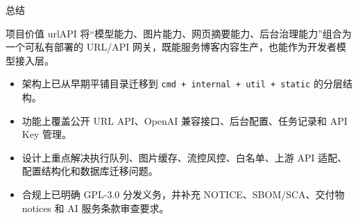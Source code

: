 \documentclass[aspectratio=169,UTF8]{ctexbeamer}
\newcommand{\code}[1]{\texttt{#1}}
\begin{document}
\begin{frame}{总结}
  \begin{block}{项目价值}
    urlAPI 将“模型能力、图片能力、网页摘要能力、后台治理能力”组合为一个可私有部署的 URL/API 网关，既能服务博客内容生产，也能作为开发者模型接入层。
  \end{block}

  \begin{itemize}
    \item 架构上已从早期平铺目录迁移到 \code{cmd + internal + util + static} 的分层结构。
    \item 功能上覆盖公开 URL API、OpenAI 兼容接口、后台配置、任务记录和 API Key 管理。
    \item 设计上重点解决执行队列、图片缓存、流控风控、白名单、上游 API 适配、配置结构化和数据库迁移问题。
    \item 合规上已明确 GPL-3.0 分发义务，并补充 NOTICE、SBOM/SCA、交付物 notices 和 AI 服务条款审查要求。
  \end{itemize}
\end{frame}
\end{document}
